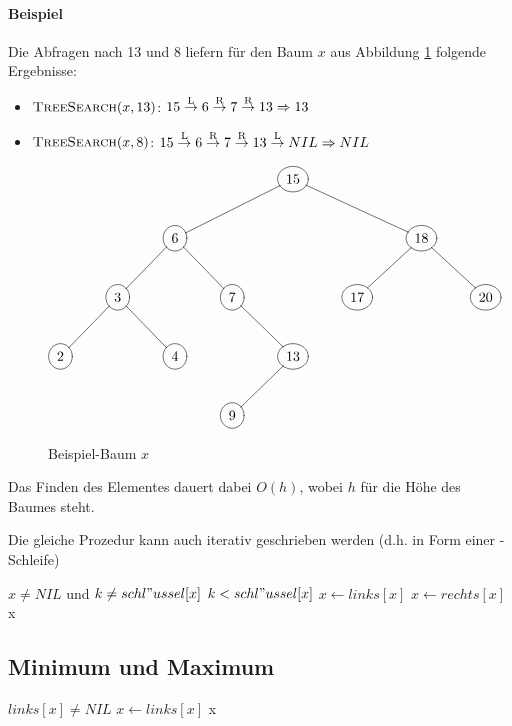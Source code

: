 \documentclass[a4paper]{scrartcl}
\begin{document}
\paragraph{Beispiel}
Die Abfragen nach 13 und 8 liefern für den Baum $x$ aus Abbildung \ref{tree4} folgende Ergebnisse:
\begin{itemize}
\item $\textnormal{\scshape TreeSearch}(x,13)$: $15 \stackrel{\text{L}}{\rightarrow} 6 \stackrel{\text{R}}{\rightarrow} 7 
			\stackrel{\text{R}}{\rightarrow} 13 \Rightarrow 13$
\item $\textnormal{\scshape TreeSearch}(x,8)$:  $15 \stackrel{\text{L}}{\rightarrow} 6 \stackrel{\text{R}}{\rightarrow} 7 
			\stackrel{\text{R}}{\rightarrow} 13	\stackrel{\text{L}}{\rightarrow} NIL \Rightarrow NIL$
\end{itemize}
\begin{figure}[htb]
	\centering
	$\begin{xy}
		\entrymodifiers={++[o][F-]}
		\xymatrix {
	  	*{} & *{} & *{} & *{} &  15 \ar@{-}[rrd]\ar@{-}[lld]& *{} & *{} & *{} \\
	  	*{} & *{} &   6 \ar@{-}[rd]\ar@{-}[ld]& *{} & *{} & *{} &  18 \ar@{-}[rd]\ar@{-}[ld]& *{} \\
	  	*{} &   3 \ar@{-}[rd]\ar@{-}[ld]& *{} &   7\ar@{-}[rd] & *{} &  17 & *{} &  20 \\
	  	  2 & *{} &   4 & *{} &  13 \ar@{-}[ld] & *{} & *{} & *{} \\
	  	*{} & *{} & *{} &   9 & *{} & *{} & *{} & *{} \\
		}
	\end{xy}$
	\caption{Beispiel-Baum $x$}
	\label{tree4}
\end{figure}
Das Finden des Elementes dauert dabei $O(h)$, wobei $h$ für die Höhe des Baumes steht.

Die gleiche Prozedur kann auch iterativ geschrieben werden (d.h. in Form einer \While-Schleife)
\begin{codebox}
\li \While $x \neq NIL$ und $k \neq schl"ussel[x]$
\li		\Do \If $k < schl"ussel[x]$
\li					\Then $x \gets links[x]$
\li					\Else $x \gets rechts[x]$
					\End
			\End
\li	\Return x
\end{codebox}

\subsection{Minimum und Maximum}
\begin{codebox}
\li \While $links[x] \neq NIL$
\li 	\Do $x \gets links[x]$
		\End
\li	\Return x
\end{codebox}
\end{document}
